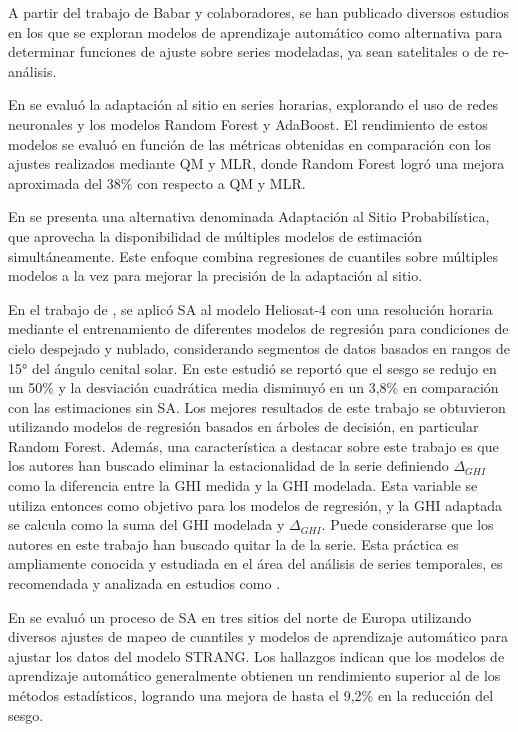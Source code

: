 \documentclass[letterpaper,12pt, twoside]{report}
\providecommand{\DIFdeltex}[1]{{\protect\color{red} \scriptsize #1}} %
\providecommand{\DIFdel}[1]{\texorpdfstring{\DIFdeltex{#1}}{}} %
\begin{document}
\DIFdel{A partir del trabajo de Babar y colaboradores, se han publicado diversos estudios en los que se exploran modelos de aprendizaje automático como alternativa para determinar funciones de ajuste sobre series modeladas, ya sean satelitales o de re-análisis.
}%

\DIFdel{En \citep{NARVAEZ2021} se evaluó la adaptación al sitio en series horarias, explorando el uso de redes neuronales y los modelos Random Forest y AdaBoost. El rendimiento de estos modelos se evaluó en función de las métricas obtenidas en comparación con los ajustes realizados mediante QM y MLR, donde Random Forest logró una mejora aproximada del 38\% con respecto a QM y MLR.
}%

\DIFdel{En \citep{YANG2021} se presenta una alternativa denominada Adaptación al Sitio Probabilística, que aprovecha la disponibilidad de múltiples modelos de estimación simultáneamente. Este enfoque combina regresiones de cuantiles sobre múltiples modelos a la vez para mejorar la precisión de la adaptación al sitio.
}%

\DIFdel{En el trabajo de \citep{SALAMALIKIS2022}, se aplicó SA al modelo Heliosat-4 con una resolución horaria mediante el entrenamiento de diferentes modelos de regresión para condiciones de cielo despejado y nublado, considerando segmentos de datos basados en rangos de 15° del ángulo cenital solar. En este estudió se reportó  que el sesgo se redujo en un 50\% y la desviación cuadrática media disminuyó en un 3,8\% en comparación con las estimaciones sin SA. Los mejores resultados de este trabajo se obtuvieron utilizando modelos de regresión basados en árboles de decisión, en particular Random Forest. Además, una característica a destacar sobre este trabajo es que los autores han buscado eliminar la estacionalidad de la serie definiendo $\Delta_{GHI}$ como la diferencia entre la GHI medida y la GHI modelada. Esta variable se utiliza entonces como objetivo para los modelos de regresión, y la GHI adaptada se calcula como la suma del GHI modelada y $\Delta_{GHI}$. Puede considerarse que los autores en este trabajo han buscado quitar la }%
\DIFdel{de la serie. Esta práctica es ampliamente conocida y estudiada en el área del análisis de series temporales, es recomendada y analizada en estudios como \citep{THORNTON2013, Claveria2015}.   
}%

\DIFdel{En \citep{ZAINALI2024} se evaluó un proceso de SA en tres sitios del norte de Europa utilizando diversos ajustes de mapeo de cuantiles y modelos de aprendizaje automático para ajustar los datos del modelo STRANG. Los hallazgos indican que los modelos de aprendizaje automático generalmente obtienen un rendimiento superior al de los métodos estadísticos, logrando una mejora de hasta el 9,2\% en la reducción del sesgo.
}%
\end{document}
